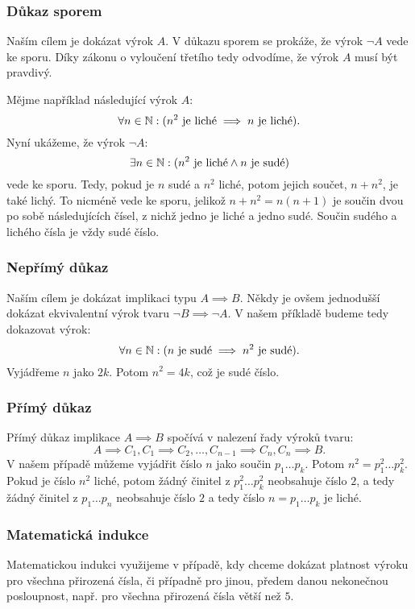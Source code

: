 \subsubsection{Důkaz sporem}
Naším cílem je dokázat výrok $A$. V důkazu sporem se prokáže, že výrok 
$\neg A$ vede ke sporu. Díky zákonu o vyloučení třetího tedy odvodíme, že 
výrok $A$ musí být pravdivý.

Mějme například následující výrok $A$:
$$\forall n \in \mathbb{N}: (\text{$n^2$ je liché} \implies \text{$n$ je liché}).$$
Nyní ukážeme, že výrok $\neg A$:
$$\exists n \in \mathbb{N}: (\text{$n^2$ je liché} \land \text{$n$ je sudé})$$
vede ke sporu. Tedy, pokud je $n$ sudé a $n^2$ liché, potom jejich součet,
$n + n^2$, je také lichý. To nicméně vede ke sporu, jelikož $n + n^2 = n(n+1)$
je součin dvou po sobě následujících čísel, z nichž jedno je liché a jedno
sudé. Součin sudého a lichého čísla je vždy sudé číslo.

\subsubsection{Nepřímý důkaz}

Naším cílem je dokázat implikaci typu $A \implies B$. Někdy je ovšem
jednodušší dokázat ekvivalentní výrok tvaru $\neg B \implies \neg A$.
V našem příkladě budeme tedy dokazovat výrok:
$$\forall n \in \mathbb{N}: (\text{$n$ je sudé} \implies \text{$n^2$ je sudé}).$$
Vyjádřeme $n$ jako $2k$. Potom $n^2 = 4k$, což je sudé číslo.

\subsubsection{Přímý důkaz}

Přímý důkaz implikace $A \implies B$ spočívá v nalezení řady 
výroků tvaru: 
$$A \implies C_1, C_1 \implies C_2, \dots, C_{n-1} \implies C_n, C_n \implies B.$$
V našem případě můžeme vyjádřit číslo $n$ jako součin $p_1 \dots p_k$. Potom
$n^2 = p_1^2 \dots p_k^2$. Pokud je číslo $n^2$ liché, potom žádný činitel
z $p_1^2 \dots p_k^2$ neobsahuje číslo $2$, a tedy žádný činitel z 
$p_1 \dots p_n$ neobsahuje číslo $2$ a tedy číslo $n = p_1 \dots p_k$
je liché.

\subsubsection{Matematická indukce}
Matematickou indukci využijeme v případě, kdy chceme dokázat platnost výroku
pro všechna přirozená čísla, či případně pro jinou, předem danou nekonečnou
posloupnost, např. pro všechna přirozená čísla větší než $5$.

